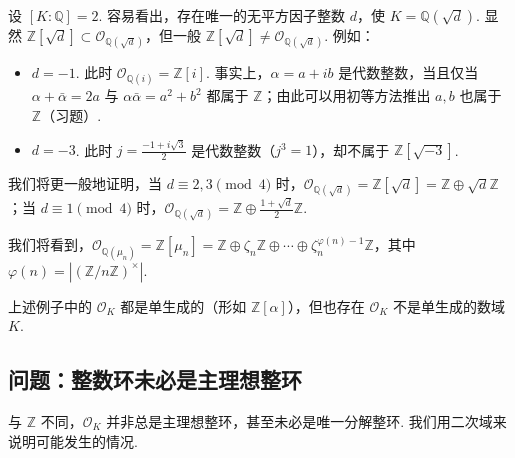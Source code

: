 \begin{example*}[二次域情形]

设 $[K:\mathbb{Q}]=2$. 容易看出，存在唯一的无平方因子整数 $d$，使 $K=\mathbb{Q}(\sqrt d)$. 显然 $\mathbb{Z}[\sqrt d]\subset\mathcal O_{\mathbb{Q}(\sqrt d)}$，但一般 $\mathbb{Z}[\sqrt d]\ne\mathcal O_{\mathbb{Q}(\sqrt d)}$. 例如：

\begin{itemize}

\item $d=-1$. 此时 $\mathcal O_{\mathbb{Q}(i)}=\mathbb{Z}[i]$. 事实上，$\alpha=a+ib$ 是代数整数，当且仅当 $\alpha+\bar\alpha=2a$ 与 $\alpha\bar\alpha=a^2+b^2$ 都属于 $\mathbb{Z}$；由此可以用初等方法推出 $a,b$ 也属于 $\mathbb{Z}$（习题）.

\item $d=-3$. 此时 $j=\frac{-1+i\sqrt3}{2}$ 是代数整数（$j^3=1$），却不属于 $\mathbb{Z}[\sqrt{-3}]$.

\end{itemize}

我们将更一般地证明，当 $d\equiv2,3\pmod4$ 时，$\mathcal O_{\mathbb{Q}(\sqrt d)}=\mathbb{Z}[\sqrt d]=\mathbb{Z}\oplus\sqrt d\mathbb{Z}$；当 $d\equiv1\pmod4$ 时，$\mathcal O_{\mathbb{Q}(\sqrt d)}=\mathbb{Z}\oplus\frac{1+\sqrt d}{2}\mathbb{Z}$.

\end{example*}

\begin{example*}[分圆情形]

我们将看到，$\mathcal O_{\mathbb{Q}(\mu_n)}=\mathbb{Z}[\mu_n]=\mathbb{Z}\oplus\zeta_n\mathbb{Z}\oplus\cdots\oplus\zeta_n^{\varphi(n)-1}\mathbb{Z}$，其中 $\varphi(n)=|(\mathbb{Z}/n\mathbb{Z})^\times|$.

\end{example*}

\begin{remark*}

上述例子中的 $\mathcal O_K$ 都是单生成的（形如 $\mathbb{Z}[\alpha]$），但也存在 $\mathcal O_K$ 不是单生成的数域 $K$.

\end{remark*}

\subsection{问题：整数环未必是主理想整环}\label{sec:nt-1-2-3}

与 $\mathbb{Z}$ 不同，$\mathcal O_K$ 并非总是主理想整环，甚至未必是唯一分解整环. 我们用二次域来说明可能发生的情况.

